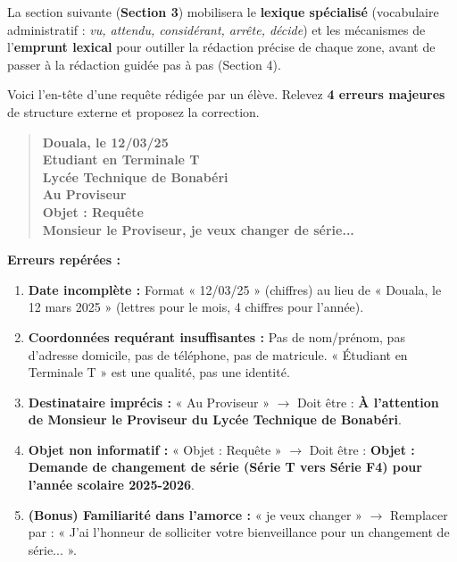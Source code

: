 \documentclass[11pt]{article}
\begin{document}
La section suivante (\textbf{Section 3}) mobilisera le \textbf{lexique spécialisé} (vocabulaire administratif : \emph{vu, attendu, considérant, arrête, décide}) et les mécanismes de l'\textbf{emprunt lexical} pour outiller la rédaction précise de chaque zone, avant de passer à la rédaction guidée pas à pas (Section 4).

\begin{exercice}
Voici l'en-tête d'une requête rédigée par un élève. Relevez \textbf{4 erreurs majeures} de structure externe et proposez la correction.

\begin{quote}
\textbf{Douala, le 12/03/25}\\
\textbf{Etudiant en Terminale T}\\
\textbf{Lycée Technique de Bonabéri}\\
\textbf{Au Proviseur}\\
\textbf{Objet : Requête}\\
\textbf{Monsieur le Proviseur, je veux changer de série...}
\end{quote}
\end{exercice}

\begin{corrige}
\textbf{Erreurs repérées :}
\begin{enumerate}
    \item \textbf{Date incomplète :} Format « 12/03/25 » (chiffres) au lieu de « Douala, le 12 mars 2025 » (lettres pour le mois, 4 chiffres pour l'année).
    \item \textbf{Coordonnées requérant insuffisantes :} Pas de nom/prénom, pas d'adresse domicile, pas de téléphone, pas de matricule. « Étudiant en Terminale T » est une qualité, pas une identité.
    \item \textbf{Destinataire imprécis :} « Au Proviseur » $\rightarrow$ Doit être : \textbf{À l'attention de Monsieur le Proviseur du Lycée Technique de Bonabéri}.
    \item \textbf{Objet non informatif :} « Objet : Requête » $\rightarrow$ Doit être : \textbf{Objet : Demande de changement de série (Série T vers Série F4) pour l'année scolaire 2025-2026}.
    \item \textbf{(Bonus) Familiarité dans l'amorce :} « je veux changer » $\rightarrow$ Remplacer par : « J'ai l'honneur de solliciter votre bienveillance pour un changement de série... ».
\end{enumerate}
\end{corrige}
\end{document}
